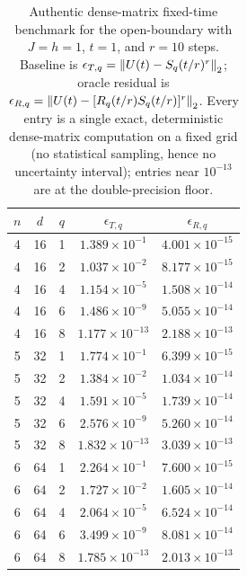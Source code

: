 \begin{table}[t]
\caption{Authentic dense-matrix fixed-time benchmark for the open-boundary \tfim{} with $J=h=1$, $t=1$, and $r=10$ steps. Baseline is $\epsilon_{T,q}=\left\lVert U(t)-S_q(t/r)^r \right\rVert_2$; oracle residual is $\epsilon_{R,q}=\left\lVert U(t)-[R_q(t/r)S_q(t/r)]^r \right\rVert_2$. Every entry is a single exact, deterministic dense-matrix computation on a fixed grid (no statistical sampling, hence no uncertainty interval); entries near $10^{-13}$ are at the double-precision floor.}
\label{tab:error-summary}
\centering
\begin{tabular}{ccccc}
\toprule
$n$ & $d$ & $q$ & $\epsilon_{T,q}$ & $\epsilon_{R,q}$\\
\midrule
4 & 16 & 1 & $1.389\times10^{-1}$ & $4.001\times10^{-15}$\\
4 & 16 & 2 & $1.037\times10^{-2}$ & $8.177\times10^{-15}$\\
4 & 16 & 4 & $1.154\times10^{-5}$ & $1.508\times10^{-14}$\\
4 & 16 & 6 & $1.486\times10^{-9}$ & $5.055\times10^{-14}$\\
4 & 16 & 8 & $1.177\times10^{-13}$ & $2.188\times10^{-13}$\\
5 & 32 & 1 & $1.774\times10^{-1}$ & $6.399\times10^{-15}$\\
5 & 32 & 2 & $1.384\times10^{-2}$ & $1.034\times10^{-14}$\\
5 & 32 & 4 & $1.591\times10^{-5}$ & $1.739\times10^{-14}$\\
5 & 32 & 6 & $2.576\times10^{-9}$ & $5.260\times10^{-14}$\\
5 & 32 & 8 & $1.832\times10^{-13}$ & $3.039\times10^{-13}$\\
6 & 64 & 1 & $2.264\times10^{-1}$ & $7.600\times10^{-15}$\\
6 & 64 & 2 & $1.727\times10^{-2}$ & $1.605\times10^{-14}$\\
6 & 64 & 4 & $2.064\times10^{-5}$ & $6.524\times10^{-14}$\\
6 & 64 & 6 & $3.499\times10^{-9}$ & $8.081\times10^{-14}$\\
6 & 64 & 8 & $1.785\times10^{-13}$ & $2.013\times10^{-13}$\\
\bottomrule
\end{tabular}
\end{table}
